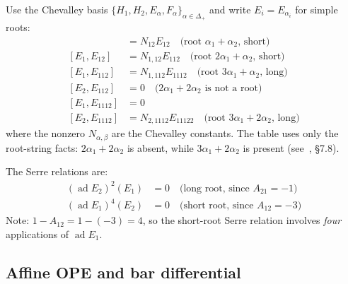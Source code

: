\begin{computation}\label{comp:G2-structure}
Use the Chevalley basis
$\{H_1, H_2, E_\alpha, F_\alpha\}_{\alpha \in \Delta_+}$
and write $E_i = E_{\alpha_i}$ for simple roots:
\begin{align}
[E_1, E_2] &= N_{12}E_{12} \quad\text{(root $\alpha_1+\alpha_2$, short)} \\
[E_1, E_{12}] &= N_{1,12}E_{112} \quad\text{(root $2\alpha_1+\alpha_2$, short)} \\
[E_1, E_{112}] &= N_{1,112}E_{1112} \quad\text{(root $3\alpha_1+\alpha_2$, long)} \\
[E_2, E_{112}] &= 0
 \quad\text{($2\alpha_1+2\alpha_2$ is not a root)} \\
[E_1, E_{1112}] &= 0 \\
[E_2, E_{1112}] &= N_{2,1112}E_{11122}
 \quad\text{(root $3\alpha_1+2\alpha_2$, long)}
\end{align}
where the nonzero $N_{\alpha,\beta}$ are the Chevalley constants.
The table uses only the root-string facts: $2\alpha_1+2\alpha_2$
is absent, while $3\alpha_1+2\alpha_2$ is present
(see~\cite{Kac}, \S7.8).

The Serre relations are:
\begin{align}
(\operatorname{ad} E_2)^2(E_1) &= 0
 \quad\text{(long root, since $A_{21} = -1$)}
 \label{eq:serre-G2-long} \\
(\operatorname{ad} E_1)^4(E_2) &= 0
 \quad\text{(short root, since $A_{12} = -3$)}
 \label{eq:serre-G2-short}
\end{align}
Note: $1 - A_{12} = 1 - (-3) = 4$, so the short-root Serre
relation involves \emph{four} applications of $\operatorname{ad} E_1$.
\end{computation}

\subsection{Affine OPE and bar differential}

